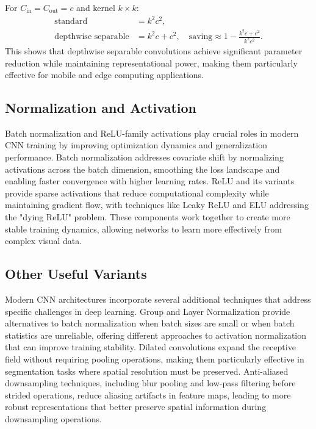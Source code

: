 \begin{remark}
For $C_{\text{in}}=C_{\text{out}}=c$ and kernel $k\times k$:
\begin{align}
\text{standard} &= k^2 c^2,\\
\text{depthwise separable} &= k^2 c + c^2,\quad \text{saving} \approx 1 - \frac{k^2 c + c^2}{k^2 c^2}.
\end{align}
This shows that depthwise separable convolutions achieve significant parameter reduction while maintaining representational power, making them particularly effective for mobile and edge computing applications.
\end{remark}

\subsection{Normalization and Activation}
Batch normalization and ReLU-family activations play crucial roles in modern CNN training by improving optimization dynamics and generalization performance. Batch normalization addresses covariate shift by normalizing activations across the batch dimension, smoothing the loss landscape and enabling faster convergence with higher learning rates. ReLU and its variants provide sparse activations that reduce computational complexity while maintaining gradient flow, with techniques like Leaky ReLU and ELU addressing the "dying ReLU" problem. These components work together to create more stable training dynamics, allowing networks to learn more effectively from complex visual data.\cite{Ioffe2015}

\subsection{Other Useful Variants}
Modern CNN architectures incorporate several additional techniques that address specific challenges in deep learning. Group and Layer Normalization provide alternatives to batch normalization when batch sizes are small or when batch statistics are unreliable, offering different approaches to activation normalization that can improve training stability. Dilated convolutions expand the receptive field without requiring pooling operations, making them particularly effective in segmentation tasks where spatial resolution must be preserved. Anti-aliased downsampling techniques, including blur pooling and low-pass filtering before strided operations, reduce aliasing artifacts in feature maps, leading to more robust representations that better preserve spatial information during downsampling operations.

